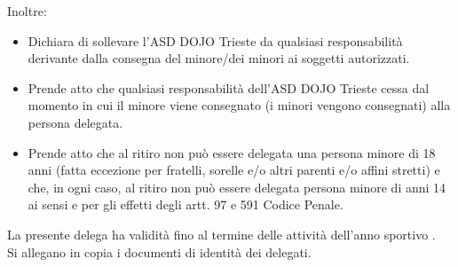 \documentclass{djtsmod}
\begin{document}
	Inoltre:
	\begin{itemize}
		\item Dichiara di sollevare l'ASD DOJO Trieste da qualsiasi responsabilità derivante dalla consegna del minore/dei minori ai soggetti autorizzati.
		\item Prende atto che qualsiasi responsabilità dell'ASD DOJO Trieste cessa dal momento in cui il minore viene consegnato (i minori vengono consegnati) alla persona delegata.
		\item Prende atto che al ritiro non può essere delegata una persona minore di 18 anni (fatta eccezione per fratelli, sorelle e/o altri parenti e/o affini stretti) e che, in ogni caso, al ritiro non può essere delegata persona minore di anni 14 ai sensi e per gli effetti degli artt. 97 e 591 Codice Penale.
	\end{itemize}
	La presente delega ha validità fino al termine delle attività dell'anno sportivo \field{1.5in}. \\[5px]
	Si allegano in copia i documenti di identità dei delegati.
	
	\vspace{0.1in}
\end{document}
